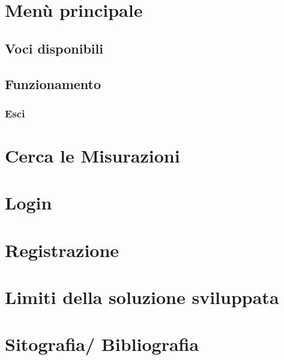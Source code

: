 \documentclass[a4paper,12pt,twoside]{article}
\begin{document}
	\newpage
	
	\section{Menù principale}
	\subsection{Voci disponibili}
	\subsection{Funzionamento}
			\subsubsection{Esci}
			
	\newpage
	
	\section{Cerca le Misurazioni}
	\section{Login}
	\section{Registrazione}

	\section{Limiti della soluzione sviluppata}
	\section{Sitografia/ Bibliografia}
	

		
	
	

	

	

	
	
	
	
	
\end{document}
